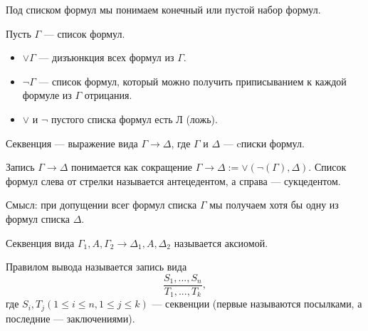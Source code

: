 
    \begin{Def}
        Под списком формул мы понимаем конечный или пустой набор формул.
    \end{Def}

    \begin{Def}
        Пусть $\Gamma$ --- список формул. 
        \begin{itemize}
            \item $\vee \Gamma$ --- дизъюнкция всех формул из $\Gamma$.
            \item $\neg \Gamma$ --- список формул, который можно получить приписыванием к каждой формуле из $\Gamma$ отрицания.
            \item $\vee$ и $\neg$ пустого списка формул есть Л (ложь).
        \end{itemize}
    \end{Def}

    \begin{Def}
        Секвенция --- выражение вида $\Gamma \rightarrow \Delta$, где $\Gamma$ и $\Delta$ --- cписки формул.

        Запись $\Gamma \rightarrow \Delta$ понимается как сокращение $\Gamma \rightarrow \Delta := \vee(\neg(\Gamma), \Delta)$. Список формул слева от стрелки называется антецедентом, а справа --- сукцедентом.
    \end{Def}

    \begin{Rem}
        Смысл: при допущении всег формул списка $\Gamma$ мы получаем хотя бы одну из формул списка $\Delta$.
    \end{Rem}

    \begin{Def}[Аксиома]
        Секвенция вида $\Gamma_1, A, \Gamma_2 \rightarrow \Delta_1, A, \Delta_2$ называется аксиомой.
    \end{Def}

    \begin{Def}
        Правилом вывода называется запись вида $$\frac{S_1, ..., S_n}{T_1, ..., T_k},$$
        где $S_i, T_j (1 \leq i \leq n, 1 \leq j \leq k)$ --- секвенции (первые называются посылками, а последние --- заключениями).
    \end{Def}

